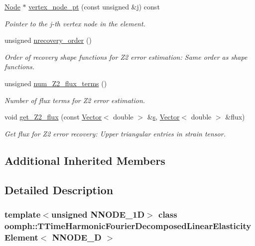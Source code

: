 \begin{DoxyCompactItemize}
\hyperlink{classoomph_1_1Node}{Node} $\ast$ \hyperlink{classoomph_1_1TTimeHarmonicFourierDecomposedLinearElasticityElement_ad02188b226cc083ee4712a2dd51739ba}{vertex\+\_\+node\+\_\+pt} (const unsigned \&j) const
\begin{DoxyCompactList}\small\item\em Pointer to the j-\/th vertex node in the element. \end{DoxyCompactList}\item 
unsigned \hyperlink{classoomph_1_1TTimeHarmonicFourierDecomposedLinearElasticityElement_a6b8053ed436ccb21829f78b9df39ea23}{nrecovery\+\_\+order} ()
\begin{DoxyCompactList}\small\item\em Order of recovery shape functions for Z2 error estimation\+: Same order as shape functions. \end{DoxyCompactList}\item 
unsigned \hyperlink{classoomph_1_1TTimeHarmonicFourierDecomposedLinearElasticityElement_ab2806da6c0c8f1f0e40d678ea1de528c}{num\+\_\+\+Z2\+\_\+flux\+\_\+terms} ()
\begin{DoxyCompactList}\small\item\em Number of \textquotesingle{}flux\textquotesingle{} terms for Z2 error estimation. \end{DoxyCompactList}\item 
void \hyperlink{classoomph_1_1TTimeHarmonicFourierDecomposedLinearElasticityElement_ad910e9982be82dee39ec30f0967e00cd}{get\+\_\+\+Z2\+\_\+flux} (const \hyperlink{classoomph_1_1Vector}{Vector}$<$ double $>$ \&\hyperlink{cfortran_8h_ab7123126e4885ef647dd9c6e3807a21c}{s}, \hyperlink{classoomph_1_1Vector}{Vector}$<$ double $>$ \&flux)
\begin{DoxyCompactList}\small\item\em Get \textquotesingle{}flux\textquotesingle{} for Z2 error recovery\+: Upper triangular entries in strain tensor. \end{DoxyCompactList}\end{DoxyCompactItemize}
\subsection*{Additional Inherited Members}


\subsection{Detailed Description}
\subsubsection*{template$<$unsigned N\+N\+O\+D\+E\+\_\+1D$>$\newline
class oomph\+::\+T\+Time\+Harmonic\+Fourier\+Decomposed\+Linear\+Elasticity\+Element$<$ N\+N\+O\+D\+E\+\_\+D $>$}

